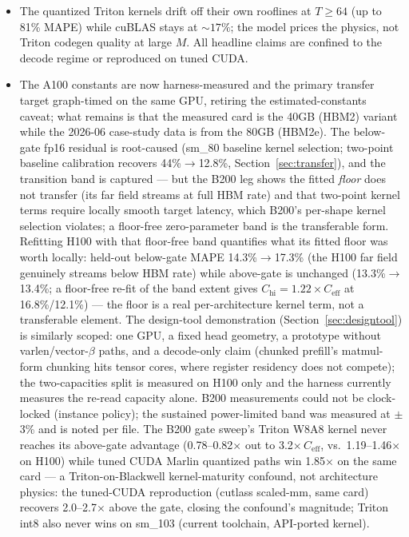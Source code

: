 \documentclass[10pt,twocolumn]{article}
\begin{document}
\begin{itemize}[leftmargin=*,topsep=0pt]
  \item The quantized Triton kernels drift off their own rooflines at $T\geq 64$ (up to 81\% MAPE) while cuBLAS stays at ${\sim}17\%$; the model prices the physics, not Triton codegen quality at large $M$.  All headline claims are confined to the decode regime or reproduced on tuned CUDA.
  \item The A100 constants are now harness-measured and the primary transfer target graph-timed on the same GPU, retiring the estimated-constants caveat; what remains is that the measured card is the 40GB (HBM2) variant while the 2026-06 case-study data is from the 80GB (HBM2e).  The below-gate fp16 residual is root-caused (sm\_80 baseline kernel selection; two-point baseline calibration recovers 44\%$\to$12.8\%, Section~\ref{sec:transfer}), and the transition band is captured --- but the B200 leg shows the fitted \emph{floor} does not transfer (its far field streams at full HBM rate) and that two-point kernel terms require locally smooth target latency, which B200's per-shape kernel selection violates; a floor-free zero-parameter band is the transferable form.  Refitting H100 with that floor-free band quantifies what its fitted floor was worth locally: held-out below-gate MAPE 14.3\%$\to$17.3\% (the H100 far field genuinely streams below HBM rate) while above-gate is unchanged (13.3\%$\to$13.4\%; a floor-free re-fit of the band extent gives $C_\text{hi}=1.22\times C_\text{eff}$ at 16.8\%/12.1\%) --- the floor is a real per-architecture kernel term, not a transferable element.  The design-tool demonstration (Section~\ref{sec:designtool}) is similarly scoped: one GPU, a fixed head geometry, a prototype without varlen/vector-$\beta$ paths, and a decode-only claim (chunked prefill's matmul-form chunking hits tensor cores, where register residency does not compete); the two-capacities split is measured on H100 only and the harness currently measures the re-read capacity alone.  B200 measurements could not be clock-locked (instance policy); the sustained power-limited band was measured at $\pm$3\% and is noted per file.  The B200 gate sweep's Triton W8A8 kernel never reaches its above-gate advantage (0.78--0.82$\times$ out to 3.2$\times\,C_\text{eff}$, vs.\ 1.19--1.46$\times$ on H100) while tuned CUDA Marlin quantized paths win 1.85$\times$ on the same card --- a Triton-on-Blackwell kernel-maturity confound, not architecture physics: the tuned-CUDA reproduction (cutlass scaled-mm, same card) recovers 2.0--2.7$\times$ above the gate, closing the confound's magnitude; Triton int8 also never wins on sm\_103 (current toolchain, API-ported kernel).

\end{itemize}
\end{document}
